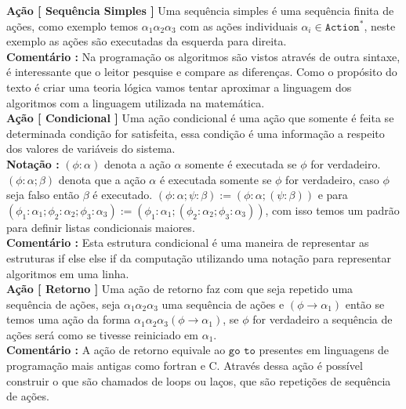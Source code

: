 \documentclass[10pt,a4paper]{report}
\begin{document}
\textbf{Ação [ Sequência Simples ]} Uma sequência simples é uma sequência finita de ações, como exemplo temos $ \alpha_1 \alpha_2 \alpha_3$ com as ações individuais $\alpha_i \in \texttt{Action}^*$, neste exemplo as ações são executadas da esquerda para direita.\\

\textbf{Comentário :} Na programação os algoritmos são vistos através de outra sintaxe, é interessante que o leitor pesquise e compare as diferenças. Como o propósito do texto é criar uma teoria lógica vamos tentar aproximar a linguagem dos algoritmos com a linguagem utilizada na matemática.\\

\textbf{Ação [ Condicional ]} Uma ação condicional é uma ação que somente é feita se determinada condição for satisfeita, essa condição é uma informação a respeito dos valores de variáveis do sistema.\\

\textbf{Notação :} $ (\phi : \alpha ) $ denota a ação $\alpha$ somente é executada se $\phi$ for verdadeiro. $ (\phi : \alpha ; \beta) $ denota que a ação $\alpha$ é executada somente se $\phi$ for verdadeiro, caso $\phi$ seja falso então $\beta$ é executado. $ (\phi : \alpha ; \psi : \beta ) := ( \phi : \alpha ; (\psi : \beta) ) $ e para $ ( \phi_1 : \alpha_1 ; \phi_2 : \alpha_2 ; \phi_3 : \alpha_3 ) := ( \phi_1 : \alpha_1 ; ( \phi_2 : \alpha_2 ; \phi_3 : \alpha_3 ) ) $, com isso temos um padrão para definir listas condicionais maiores.\\

\textbf{Comentário :} Esta estrutura condicional é uma maneira de representar as estruturas if else else if da computação utilizando uma notação para representar algoritmos em uma linha.\\

\textbf{Ação [ Retorno ]} Uma ação de retorno faz com que seja repetido uma sequência de ações, seja $\alpha_1 \alpha_2 \alpha_3$ uma sequência de ações e $(\phi \rightarrow \alpha_1)$ então se temos uma ação da forma $ \alpha_1 \alpha_2 \alpha_3 (\phi \rightarrow \alpha_1) $, se $\phi$ for verdadeiro a sequência de ações será como se tivesse reiniciado em $\alpha_1$.\\

\textbf{Comentário :} A ação de retorno equivale ao $\texttt{go to}$ presentes em linguagens de programação mais antigas como fortran e C. Através dessa ação é possível construir o que são chamados de loops ou laços, que são repetições de sequência de ações.
\end{document}
